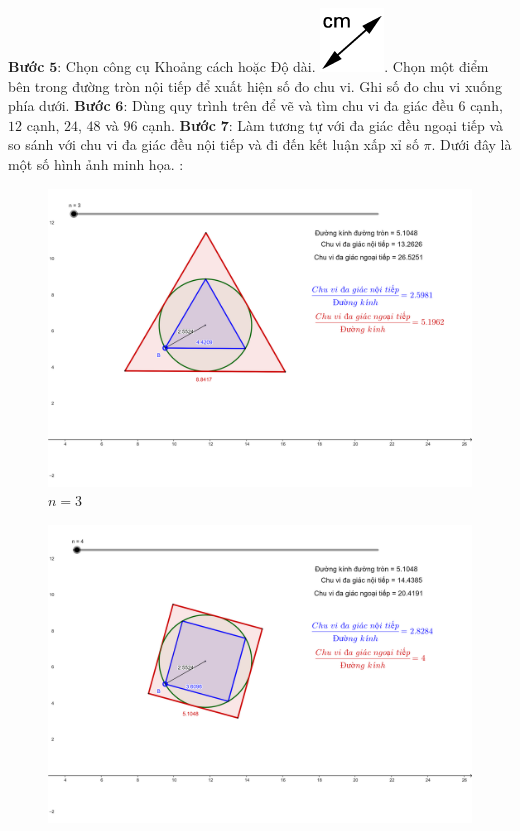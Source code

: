 \begin{multicols}{2}
	\vskip 0.1cm
	\textbf{\color{lichsutoanhoc}Bước} $\pmb{5}$: Chọn công cụ Khoảng cách hoặc Độ dài.  \includegraphics[scale =0.25]{9}. Chọn một điểm bên trong đường tròn nội tiếp để xuất hiện số đo chu vi. Ghi số đo chu vi xuống phía dưới. 
	\vskip 0.1cm
	\textbf{\color{lichsutoanhoc}Bước} $\pmb{6}$: Dùng quy trình trên để vẽ và tìm chu vi đa giác đều $6$ cạnh, $12$ cạnh, $24$, $48$ và $96$ cạnh.
	\vskip 0.1cm
	\textbf{\color{lichsutoanhoc}Bước} $\pmb{7}$: Làm tương tự với đa giác đều ngoại tiếp và so sánh với chu vi đa giác đều nội tiếp và đi đến kết luận xấp xỉ số $\pi$.
	\vskip 0.1cm  
	Dưới đây là một số hình ảnh minh họa. :
	\begin{figure}[H]
		\vspace*{-5pt}
		\centering
		\captionsetup{labelformat= empty, justification=centering}
		\includegraphics[width= 1\linewidth]{10}
		\caption{\small\textit{\color{lichsutoanhoc}$n = 3$}}
		\vspace*{-10pt}
	\end{figure}
	\begin{figure}[H]
		\vspace*{-5pt}
		\centering
		\captionsetup{labelformat= empty, justification=centering}
		\includegraphics[width= 1\linewidth]{11}

\end{figure}
\end{multicols}
